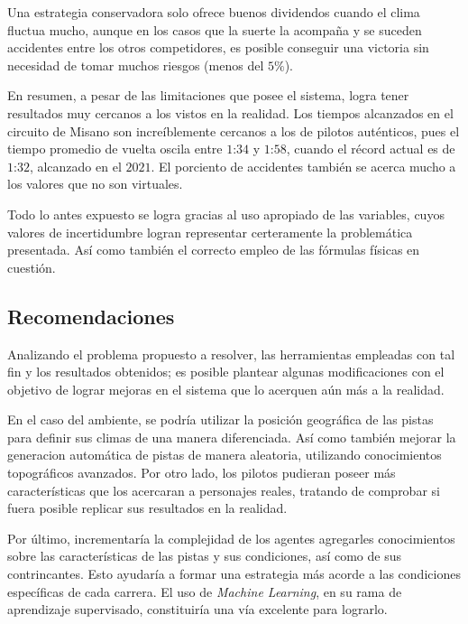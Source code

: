 \documentclass[12pt, letterpaper,spanish]{article}
\theoremstyle{definition}
\theoremstyle{remark}
\begin{document}
	Una estrategia conservadora solo ofrece buenos dividendos cuando el clima fluctua mucho, aunque en los casos que la suerte la acompaña y se suceden accidentes entre los otros competidores, es posible conseguir una victoria sin necesidad de tomar muchos riesgos (menos del $5\%$).

	En resumen, a pesar de las limitaciones que posee el sistema, logra tener resultados muy cercanos a los vistos en la realidad. Los tiempos alcanzados en el circuito de Misano son increíblemente cercanos a los de pilotos auténticos, pues el tiempo promedio de vuelta oscila entre $1$:$34$ y $1$:$58$, cuando el récord actual es de $1$:$32$, alcanzado en el $2021$. El porciento de accidentes también se acerca mucho a los valores que no son virtuales. 

	Todo lo antes expuesto se logra gracias al uso apropiado de las variables, cuyos valores de incertidumbre logran representar certeramente la problemática presentada. Así como también el correcto empleo de las fórmulas físicas en cuestión. 

	\subsection{Recomendaciones}
	Analizando el problema propuesto a resolver, las herramientas empleadas con tal fin y los resultados obtenidos; es posible plantear algunas modificaciones con el objetivo de lograr mejoras en el sistema que lo acerquen aún más a la realidad.

	En el caso del ambiente, se podría utilizar la posición geográfica de las pistas para definir sus climas de una manera diferenciada. Así como también mejorar la generacion automática de pistas de manera aleatoria, utilizando conocimientos topográficos avanzados. Por otro lado, los pilotos pudieran poseer más características que los acercaran a personajes reales, tratando de comprobar si fuera posible replicar sus resultados en la realidad.

	Por último, incrementaría la complejidad de los agentes agregarles conocimientos sobre las características de las pistas y sus condiciones, así como de sus contrincantes. Esto ayudaría a formar una estrategia más acorde a las condiciones específicas de cada carrera. El uso de \emph{Machine Learning}, en su rama de aprendizaje supervisado, constituiría una vía excelente para lograrlo. 

\pagebreak


\end{document}
